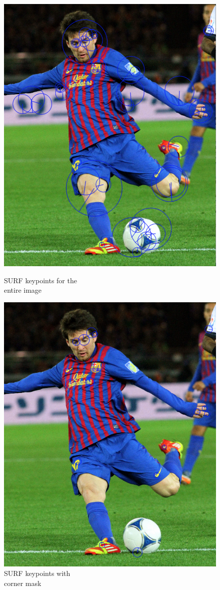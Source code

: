 \begin{figure}[ht!]
\centering
\begin{minipage}{.5\textwidth}
	\centering
	\includegraphics[width=.8\linewidth]{images/messiSurf.png}
	\caption{SURF keypoints for the\\ entire image}
	\label{fig:messiSurf}
\end{minipage}%
\begin{minipage}{.5\textwidth}
	\centering
	\includegraphics[width=.8\linewidth]{images/messiCornerSurf.png}
	\caption{SURF keypoints with\\ corner mask}
	\label{fig:messiCornerSurf}
\end{minipage}
\end{figure}


